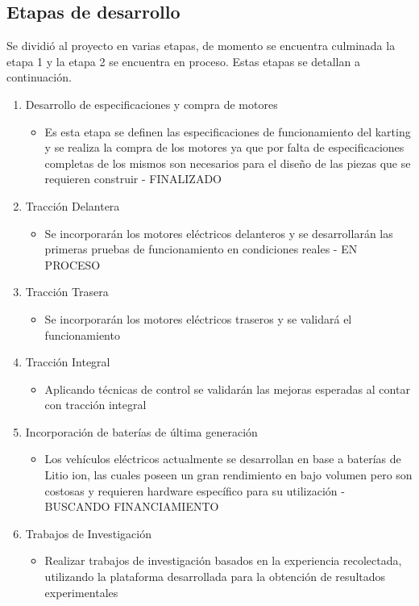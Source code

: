 \documentclass[a4]{article}
\begin{document}
\subsection{Etapas de desarrollo}
Se dividió al proyecto en varias etapas, de momento se encuentra culminada la etapa 1 y la etapa 2 se encuentra en proceso. Estas etapas se detallan a continuación.
\begin{enumerate}
    \item Desarrollo de especificaciones y compra de motores
    \begin{itemize}
        \item Es esta etapa se definen las especificaciones de funcionamiento del karting y se realiza la compra de los motores ya que por falta de especificaciones completas de los mismos son necesarios para el diseño de las piezas que se requieren construir - FINALIZADO
    \end{itemize}
    \item Tracción Delantera
    \begin{itemize}
        \item Se incorporarán los motores eléctricos delanteros y se desarrollarán las primeras pruebas de funcionamiento en condiciones reales - EN PROCESO
    \end{itemize}
    \item Tracción Trasera
    \begin{itemize}
        \item Se incorporarán los motores eléctricos traseros y se validará el funcionamiento
    \end{itemize}    
    \item Tracción Integral
    \begin{itemize}
        \item Aplicando técnicas de control se validarán las mejoras esperadas al contar con tracción integral
    \end{itemize}    
    \item Incorporación de baterías de última generación
    \begin{itemize}
        \item Los vehículos eléctricos actualmente se desarrollan en base a baterías de Litio ion, las cuales poseen un gran rendimiento en bajo volumen pero son costosas y requieren hardware específico para su utilización - BUSCANDO FINANCIAMIENTO
    \end{itemize}    
    \item Trabajos de Investigación
    \begin{itemize}
        \item Realizar trabajos de investigación basados en la experiencia recolectada, utilizando la plataforma desarrollada para la obtención de resultados experimentales
    \end{itemize}    
\end{enumerate}
\end{document}
